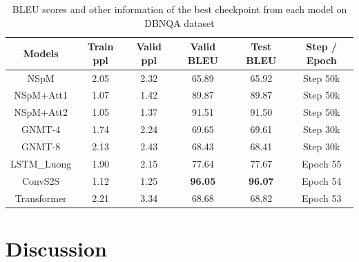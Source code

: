 \begin{table}[h]
\centering
\caption{BLEU scores and other information of the best checkpoint from each model on DBNQA dataset}
\label{table:dbnqa bleu}
\begin{tabular}{c|c|c|c|c|c}
Models & Train ppl & Valid ppl & \textbf{Valid BLEU} & \textbf{Test BLEU} & Step / Epoch \\
\hline
NSpM & 2.05 & 2.32 & 65.89 & 65.92 & Step 50k \\
NSpM+Att1 & 1.07 & 1.42 & 89.87 & 89.87 & Step 50k \\
NSpM+Att2 & 1.05 & 1.37 & 91.51 & 91.50 & Step 50k \\
GNMT-4 & 1.74 & 2.24 & 69.65 & 69.61 & Step 30k \\
GNMT-8 & 2.13 & 2.43 & 68.43 & 68.41 & Step 30k \\
LSTM\_Luong & 1.90 & 2.15 & 77.64 & 77.67 & Epoch 55 \\
ConvS2S & 1.12 & 1.25 & \textbf{96.05} & \textbf{96.07} & Epoch 54 \\
Transformer & 2.21 & 3.34 & 68.68 & 68.82 & Epoch 53 \\
\end{tabular}
\end{table}

\section{Discussion} \label{section:discussion}







